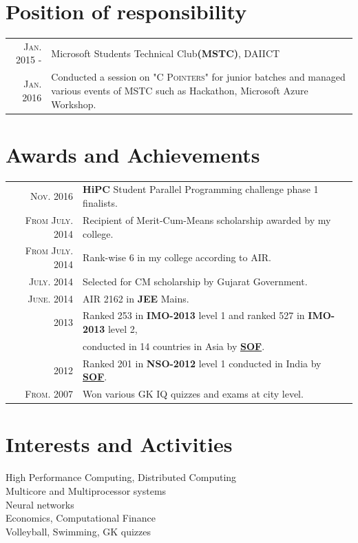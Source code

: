 \documentclass[a4paper,10pt]{article}
\begin{document}
\section{Position of responsibility}
\begin{tabular}{r|p{11cm}}
	\textsc{Jan. 2015 -} & Microsoft Students Technical Club\textbf{(MSTC)}, DAIICT\\
	\textsc{Jan. 2016} &\footnotesize{Conducted a session on \textsc{"C Pointers"} for junior batches and managed various events of MSTC such as Hackathon, Microsoft Azure Workshop.}
\end{tabular}


\section{Awards and Achievements}
\begin{tabular}{rl}
	\textsc{Nov.} 2016 & \textbf{HiPC} Student Parallel Programming challenge phase 1 finalists.\\
	\textsc{From July.} 2014 & Recipient of Merit-Cum-Means scholarship awarded by my college. \\
	\textsc{From July.} 2014 & Rank-wise 6 in my college according to AIR. \\
	\textsc{July.} 2014 & Selected for CM scholarship by Gujarat Government. \\
	\textsc{June.} 2014 & AIR 2162 in \textbf{JEE} Mains. \\
	2013 & Ranked 253 in \textbf{IMO-2013} level 1 and ranked 527 in \textbf{IMO-2013} level 2, \\
	& conducted in 14 countries in Asia by \href{www.sofworld.org}{\textbf{SOF}}.\\
	2012 & Ranked 201 in \textbf{NSO-2012} level 1 conducted in India by \href{www.sofworld.org}{\textbf{SOF}}. \\
	\textsc{From.} 2007 & Won various GK IQ quizzes and exams at city level.
\end{tabular}

\section{Interests and Activities}
High Performance Computing, Distributed Computing \\
Multicore and Multiprocessor systems\\
Neural networks\\
Economics, Computational Finance\\
Volleyball, Swimming, GK quizzes
\end{document}
